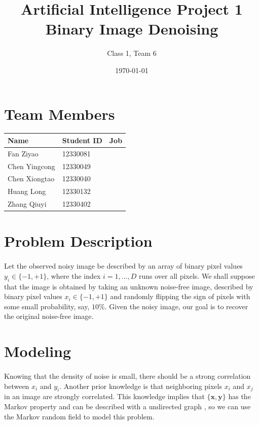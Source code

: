 \documentclass{article}
\title{}
\begin{document}


\title{
Artificial Intelligence Project 1 \\
Binary Image Denoising
}
\author{Class 1, Team 6}
\date{\today}
\maketitle

\section{Team Members}

\begin{table}[H]
\centering
\begin{tabular}{l l l}
Name & Student ID  & Job\\
\hline
Fan Ziyao & 12330081 & \\
Chen Yingcong & 12330049 & \\
Chen Xiongtao & 12330040 & \\
Huang Long & 12330132 &  \\
Zhang Qiuyi & 12330402 & 
\end{tabular}
\end{table}

\section{Problem Description}
\paragraph{}
Let the observed noisy image be described by an array of binary pixel values $y_i \in \{−1, +1\}$, where the index $i = 1, ..., D$ runs over all pixels. We shall suppose that the image is obtained by taking an unknown noise-free image, described by binary pixel values $x_i \in \{−1, +1\}$ and randomly flipping the sign of pixels with some small probability, say, $10\%$. Given the noisy image, our goal is to recover the original noise-free image.

\section{Modeling}
\paragraph{}
Knowing that the density of noise is small, there should be a strong correlation between $x_i$ and $y_i$. Another prior knowledge is that neighboring pixels $x_i$ and $x_j$ in an image are strongly correlated. This knowledge implies that $\{\mathbf{x}, \mathbf{y}\}$ has the Markov property and can be described with a undirected graph \cite{bishop2006pattern}, so we can use the Markov random field to model this problem.
\end{document}
